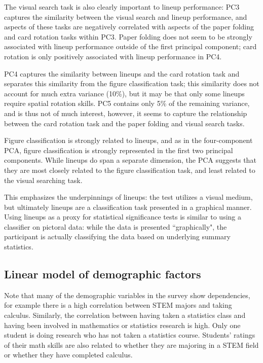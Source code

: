 \documentclass[journal]{vgtc}\usepackage[]{graphicx}\usepackage[]{color}
\begin{document}
The visual search task is also clearly important to lineup performance: PC3 captures the similarity between the visual search and lineup performance, and aspects of these tasks are negatively correlated with aspects of the paper folding and card rotation tasks within PC3. Paper folding does not seem to be strongly associated with lineup performance outside of the first principal component; card rotation is only positively associated with lineup performance in PC4.

PC4 captures the similarity between lineups and the card rotation task and separates this similarity from the figure classification task; this similarity does not account for much extra variance (10\%), but it may be that only some lineups require spatial rotation skills. PC5 contains only 5\% of the remaining variance, and is thus not of much interest, however, it seems to capture the relationship between the card rotation task and the paper folding and visual search tasks.

Figure classification is strongly related to lineups, and as in the four-component PCA, figure classification is strongly represented in the first two principal components. While lineups do span a separate dimension, the PCA suggests that they are most closely related to the figure classification task, and least related to the visual searching task.

This emphasizes the underpinnings of lineups: the test utilizes a visual medium, but ultimately lineups are a classification task presented in a graphical manner. Using lineups as a proxy for statistical significance tests is similar to using a classifier on pictoral data: while the data is presented ``graphically", the participant is actually classifying the data based on underlying summary statistics.

\subsection{Linear model of demographic factors}
Note that many of the demographic variables in the survey show dependencies, for example there is a high correlation between STEM majors and taking calculus. Similarly, the correlation  between having taken a statistics class and having been involved in mathematics or statistics research is high. Only one student is doing research who has not taken a statistics course. Students' ratings of their math skills are also related to whether they are majoring in a STEM field or whether they have completed calculus.
\end{document}
